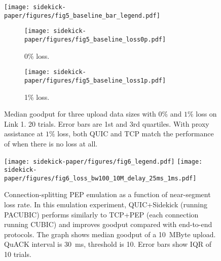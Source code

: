 \begin{figure}[t]
\centering
\texttt{[image: sidekick-paper/figures/fig5\_baseline\_bar\_legend.pdf]}
\begin{subfigure}{0.49\linewidth}
	\texttt{[image: sidekick-paper/figures/fig5\_baseline\_loss0p.pdf]}
	\caption{0\% loss.}
	\label{fig:baseline-bar:loss0p}
\end{subfigure}
\begin{subfigure}{0.49\linewidth}
	\texttt{[image: sidekick-paper/figures/fig5\_baseline\_loss1p.pdf]}
	\caption{1\% loss.}
	\label{fig:baseline-bar:loss1p}
\end{subfigure}
\vspace{-0.2cm}
\caption{Median goodput for three upload data sizes with $0\%$ and $1\%$ loss on
Link 1. 20 trials. Error bars are 1st and 3rd quartiles.
With proxy assistance at $1\%$
loss, both QUIC and TCP match the performance of when there is no loss at all.
\vspace{-0.4cm}
}
\label{fig:baseline-bar}
\end{figure}

\begin{figure}[t]
\centering
\texttt{[image: sidekick-paper/figures/fig6\_legend.pdf]}
\texttt{[image: sidekick-paper/figures/fig6\_loss\_bw100\_10M\_delay\_25ms\_1ms.pdf]}
\vspace{-0.4cm}
\caption{Connection-splitting PEP emulation as a function of near-segment
	loss rate. In this emulation experiment, QUIC+Sidekick (running PACUBIC)
  performs similarly to TCP+PEP (each connection running CUBIC)
  and improves goodput compared with end-to-end protocols. The graph shows
  median goodput of a 10~MByte upload. QuACK interval is 30~ms, threshold
is 10. Error bars show IQR of 10 trials.
\vspace{-1cm}
}
\label{fig:loss-vs-tput}
\end{figure}
